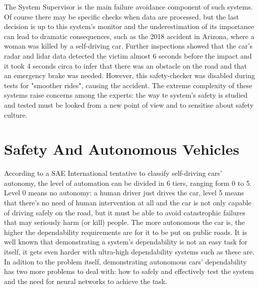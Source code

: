 The System Supervisor is the main failure avoidance component of such systems. Of course there may be specific checks when data are processed, but the last decision is up to this system's monitor and the underestimation of its importance can lead to dramatic consequences, such as the 2018 accident in Arizona, where a woman was killed by a self-driving car.\cite{arizuber} Further inspections showed that the car's radar and lidar data detected the victim almost 6 seconds before the impact and it took 4 seconds circa to infer that there was an obstacle on the road and that an emergency brake was needed. However, this safety-checker was disabled during tests for "smoother rides", causing the accident.\cite{govarizuber}\newline\newline
The extreme complexity of these systems raise concerns among the experts: the way te system's safety is studied and tested must be looked from a new point of view and to sensitise about safety culture.\cite{koopman}


\section{Safety And Autonomous Vehicles}

According to a SAE International tentative to classify self-driving cars' autonomy, the level of automation can be divided in 6 tiers, ranging form 0 to 5. Level 0 means no autonomy: a human driver just drives the car, level 5 means that there's no need of human intervention at all and the car is not only capable of driving safely on the road, but it must be able to avoid catastrophic failures that may seriously harm (or kill) people.
The more autonomous the car is, the higher the dependability requirements are for it to be put on public roads.
It is well known that demonstrating a system's dependability is not an easy task for itself, it gets even harder with ultra-high dependability systems such as these are. In adition to the problem itself, demonstrating autonomous cars' dependability has two more problems to deal with: how to safely and effectively test the system and the need for neural networks to achieve the task.

